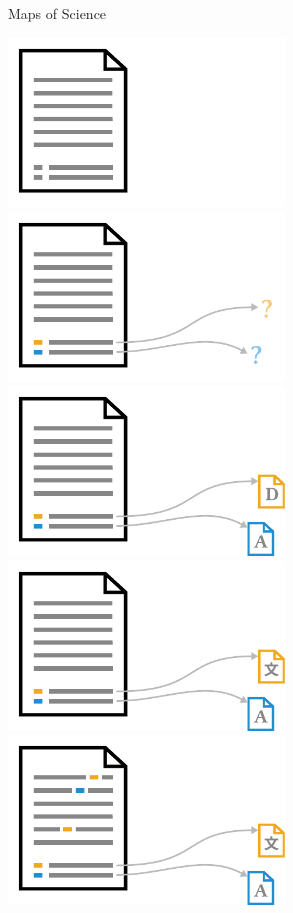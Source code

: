 \documentclass[en,16:9,smallfoot]{sdqbeamer}
\begin{document}
   \begin{frame}{Maps of Science}
       \begin{overprint}
            \centering\includegraphics[width=0.55\textwidth]{imgs/schema_add_00}
            \centering\includegraphics[width=0.55\textwidth]{imgs/schema_add_01}
            \centering\includegraphics[width=0.55\textwidth]{imgs/schema_add_02}
            \centering\includegraphics[width=0.55\textwidth]{imgs/schema_add_03}
            \centering\includegraphics[width=0.55\textwidth]{imgs/schema_add_04}

\end{overprint}
\end{frame}
\end{document}
